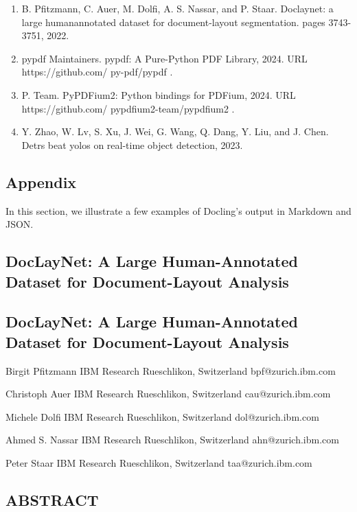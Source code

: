\begin{enumerate}
\item B. Pfitzmann, C. Auer, M. Dolfi, A. S. Nassar, and P. Staar. Doclaynet: a large humanannotated dataset for document-layout segmentation. pages 3743-3751, 2022.
\item pypdf Maintainers. pypdf: A Pure-Python PDF Library, 2024. URL https://github.com/ py-pdf/pypdf .
\item P. Team. PyPDFium2: Python bindings for PDFium, 2024. URL https://github.com/ pypdfium2-team/pypdfium2 .
\item Y. Zhao, W. Lv, S. Xu, J. Wei, G. Wang, Q. Dang, Y. Liu, and J. Chen. Detrs beat yolos on real-time object detection, 2023.
\end{enumerate}

\subsection{Appendix}

In this section, we illustrate a few examples of Docling's output in Markdown and JSON.

\subsection{DocLayNet: A Large Human-Annotated Dataset for Document-Layout Analysis}

\subsection{DocLayNet: A Large Human-Annotated Dataset for Document-Layout Analysis}

Birgit Pfitzmann IBM Research Rueschlikon, Switzerland bpf@zurich.ibm.com

Christoph Auer IBM Research Rueschlikon, Switzerland cau@zurich.ibm.com

Michele Dolfi IBM Research Rueschlikon, Switzerland dol@zurich.ibm.com

Ahmed S. Nassar IBM Research Rueschlikon, Switzerland ahn@zurich.ibm.com

Peter Staar IBM Research Rueschlikon, Switzerland taa@zurich.ibm.com

\subsection{ABSTRACT}

